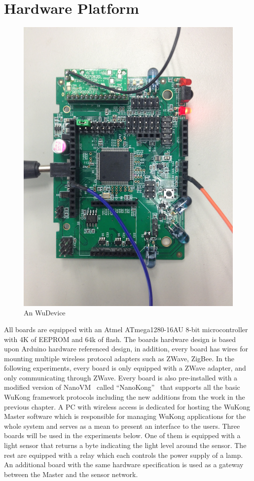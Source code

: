 \section{Hardware Platform}

\begin{figure}[h!]
\caption{An WuDevice}
\label{fig:wudevice}
\centering
    \includegraphics[width=\linewidth]{figures/wudevice}
\end{figure}

All boards are equipped with an Atmel ATmega1280-16AU 8-bit microcontroller with
4K of EEPROM and 64k of flash. The boards hardware design is based upon Arduino
hardware referenced design, in addition, every board has wires for mounting
multiple wireless protocol adapters such as ZWave, ZigBee. In the following
experiments, every board is only equipped with a ZWave adapter, and only
communicating through ZWave.  Every board is also pre-installed with a modified
version of NanoVM~\cite{Harbaum2006} called “NanoKong”~\cite{Su} that supports all the basic
WuKong framework protocols including the new additions from the work in the
previous chapter.  A PC with wireless access is dedicated for hosting the WuKong
Master software which is responsible for managing WuKong applications for the
whole system and serves as a mean to present an interface to the users.  Three
boards will be used in the experiments below. One of them is equipped with
a light sensor that returns a byte indicating the light level around the sensor.
The rest are equipped with a relay which each controls the power supply of
a lamp.  An additional board with the same hardware specification is used as
a gateway between the Master and the sensor network.


